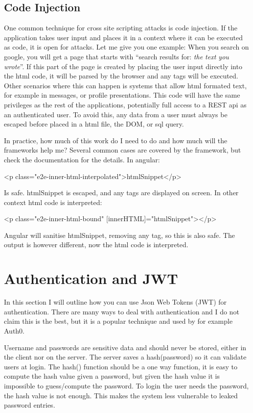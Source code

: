 \section{Code Injection} \label{chapter:code:injection}
One common technique for cross site scripting attacks is code injection. If the application takes user input and places it in a context where it can be executed as code, it is open for attacks. Let me give you one example: When you search on google, you will get a page that starts with ``search results for: \emph{the text you wrote}''. If this part of the page is created by placing the user input directly into the html code, it will be parsed by the browser and any  tags will be executed. Other scenarios where this can happen is systems that allow html formated text, for example in messages, or profile presentations. This code will have the same privileges as the rest of the applications, potentially full access to a REST api as an authenticated user. To avoid this, any data from a user must always be escaped before placed in a html file, the DOM, or sql query.

In practice, how much of this work do I need to do and how much will the frameworks help me? Several common cases are covered by the framework, but check the documentation for the details. In angular:
\begin{Code}
<p class="e2e-inner-html-interpolated">{{htmlSnippet}}</p>
\end{Code}
Is safe. htmlSnippet is escaped, and any tags are displayed on screen. In other context html code is interpreted:
\begin{Code}
<p class="e2e-inner-html-bound" [innerHTML]="htmlSnippet"></p>
\end{Code}
Angular will sanitise htmlSnippet, removing any  tag, so this is also safe. The output is however different, now the html code is interpreted.


\chapter{Authentication and JWT} \label{chapter:auth}
In this section I will outline how you can use Json Web Tokens (JWT) for authentication. There are many ways to deal with authentication and I do not claim this is the best, but it is a popular technique and used by for example Auth0.

Username and passwords are sensitive data and should never be stored, either in the client nor on the server. The server saves a hash(password) so it can validate users at login. The hash() function should be a one way function, it is easy to compute the hash value given a password, but given the hash value it is impossible to guess/compute the password. To login the user needs the password, the hash value is not enough. This makes the system less vulnerable to leaked password entries.

